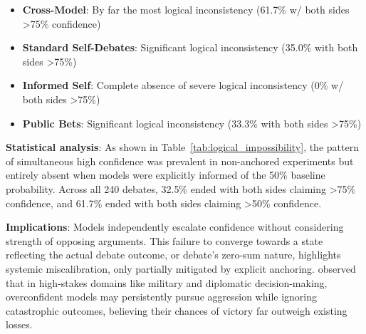 \documentclass{article}
\begin{document}
\begin{itemize}
    \item \textbf{Cross-Model}: By far the most logical inconsistency (61.7\% w/ both sides >75\% confidence)
    \item \textbf{Standard Self-Debates}: Significant logical inconsistency (35.0\% with both sides >75\%)
    \item \textbf{Informed Self}: Complete absence of severe logical inconsistency (0\% w/ both sides >75\%)
    \item \textbf{Public Bets}: Significant logical inconsistency (33.3\% with both sides >75\%)
\end{itemize}

\textbf{Statistical analysis}: As shown in Table~\ref{tab:logical_impossibility}, the pattern of simultaneous high confidence was prevalent in non-anchored experiments but entirely absent when models were explicitly informed of the 50\% baseline probability. Across all 240 debates, 32.5\% ended with both sides claiming >75\% confidence, and 61.7\% ended with both sides claiming >50\% confidence.

\textbf{Implications}: Models independently escalate confidence without considering strength of opposing arguments. This failure to converge towards a state reflecting the actual debate outcome, or debate's zero-sum nature, highlights systemic miscalibration, only partially mitigated by explicit anchoring. \citet{Rivera_2024} observed that in high-stakes domains like military and diplomatic decision-making, overconfident models may persistently pursue aggression while ignoring catastrophic outcomes, believing their chances of victory far outweigh existing losses.
\end{document}
